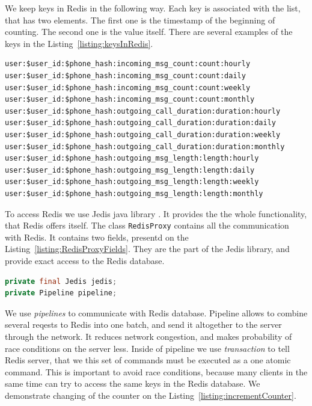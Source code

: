 We keep keys in Redis in the following way.
Each key is associated with the list, that has two elements.
The first one is the timestamp of the beginning of counting.
The second one is the value itself.
There are several examples of the keys in the Listing~\ref{listing:keysInRedis}.

\begin{lstlisting}[float=h, caption=Examples of the keys in Redis., label=listing:keysInRedis]
user:$user_id:$phone_hash:incoming_msg_count:count:hourly
user:$user_id:$phone_hash:incoming_msg_count:count:daily
user:$user_id:$phone_hash:incoming_msg_count:count:weekly
user:$user_id:$phone_hash:incoming_msg_count:count:monthly
user:$user_id:$phone_hash:outgoing_call_duration:duration:hourly
user:$user_id:$phone_hash:outgoing_call_duration:duration:daily
user:$user_id:$phone_hash:outgoing_call_duration:duration:weekly
user:$user_id:$phone_hash:outgoing_call_duration:duration:monthly
user:$user_id:$phone_hash:outgoing_msg_length:length:hourly
user:$user_id:$phone_hash:outgoing_msg_length:length:daily
user:$user_id:$phone_hash:outgoing_msg_length:length:weekly
user:$user_id:$phone_hash:outgoing_msg_length:length:monthly
\end{lstlisting}

To access Redis we use Jedis java library \cite{Jedis}.
It provides the the whole functionality, that Redis offers itself.
The class \lstinline{RedisProxy} contains all the communication with Redis.
It contains two fields, presentd on the Listing~\ref{listing:RedisProxyFields}.
They are the part of the Jedis library, and provide exact access to the Redis database.

\begin{lstlisting}[float=h, caption=Two main fields of the class RedisProxy., label=listing:RedisProxyFields, language=Java]
private final Jedis jedis;
private Pipeline pipeline;
\end{lstlisting}

We use \textit{pipelines} to communicate with Redis database.
Pipeline allows to combine several reqests to Redis into one batch, and send it altogether to the server through the network.
It reduces network congestion, and makes probability of race conditions on the server less.
Inside of pipeline we use \textit{transaction} to tell Redis server, that we this set of commands must be executed as a one atomic command.
This is important to avoid race conditions, because many clients in the same time can try to access the same keys in the Redis database.
We demonstrate changing of the counter on the Listing~\ref{listing:incrementCounter}.

